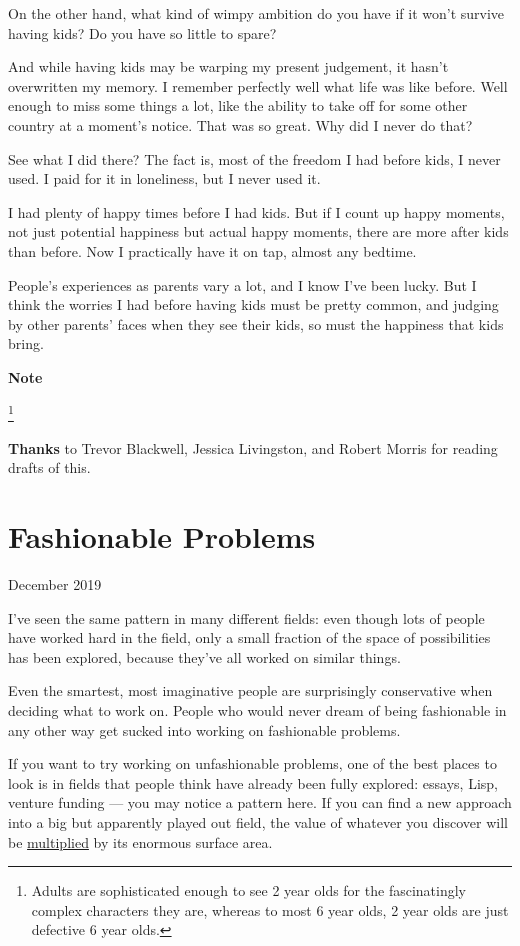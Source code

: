 \documentclass[12pt]{book}
\begin{document}
On the other hand, what kind of wimpy ambition do you have if it won't
survive having kids? Do you have so little to spare?

And while having kids may be warping my present judgement, it hasn't
overwritten my memory. I remember perfectly well what life was like
before. Well enough to miss some things a lot, like the ability to take
off for some other country at a moment's notice. That was so great. Why
did I never do that?

See what I did there? The fact is, most of the freedom I had before
kids, I never used. I paid for it in loneliness, but I never used it.

I had plenty of happy times before I had kids. But if I count up happy
moments, not just potential happiness but actual happy moments, there
are more after kids than before. Now I practically have it on tap,
almost any bedtime.

People's experiences as parents vary a lot, and I know I've been lucky.
But I think the worries I had before having kids must be pretty common,
and judging by other parents' faces when they see their kids, so must
the happiness that kids bring.

\textbf{Note}

\footnote{Adults are sophisticated enough to see 2 year olds for the
fascinatingly complex characters they are, whereas to most 6 year olds,
2 year olds are just defective 6 year olds.}

\textbf{Thanks} to Trevor Blackwell, Jessica Livingston, and Robert
Morris for reading drafts of this.
\chapter{Fashionable Problems}

December 2019

I've seen the same pattern in many different fields: even though lots of
people have worked hard in the field, only a small fraction of the space
of possibilities has been explored, because they've all worked on
similar things.

Even the smartest, most imaginative people are surprisingly conservative
when deciding what to work on. People who would never dream of being
fashionable in any other way get sucked into working on fashionable
problems.

If you want to try working on unfashionable problems, one of the best
places to look is in fields that people think have already been fully
explored: essays, Lisp, venture funding --- you may notice a pattern
here. If you can find a new approach into a big but apparently played
out field, the value of whatever you discover will be
\href{sun.html}{multiplied} by its enormous surface area.
\end{document}
